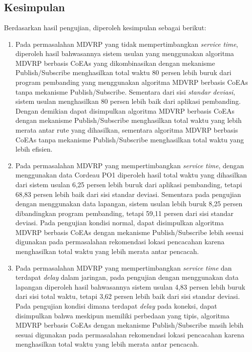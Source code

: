 \chapter{\kesimpulan}


\section{Kesimpulan}
Berdasarkan hasil pengujian, diperoleh kesimpulan sebagai berikut:

\begin{enumerate}
	\item Pada permasalahan MDVRP yang tidak mempertimbangkan \textit{service time}, diperoleh hasil bahwasannya sistem usulan yang menggunakan algoritma MDVRP berbasis CoEAs yang dikombinasikan dengan mekanisme Publish/Subscribe menghasilkan total waktu 80 persen lebih buruk dari program pembanding yang menggunakan algoritma MDVRP berbasis CoEAs tanpa mekanisme Publish/Subscribe. Sementara dari sisi \textit{standar deviasi}, sistem usulan menghasilkan 80 persen lebih baik dari aplikasi pembanding. Dengan demikian dapat disimpulkan algoritma MDVRP berbasis CoEAs dengan mekanisme Publish/Subscribe menghasilkan total waktu yang lebih merata antar rute yang dihasilkan, sementara algoritma MDVRP berbasis CoEAs tanpa mekanisme Publish/Subscribe menghasilkan total waktu yang lebih efisien.
	\item Pada permasalahan MDVRP yang mempertimbangkan \textit{service time}, dengan menggunakan data Cordeau PO1 diperoleh hasil total waktu yang dihasilkan dari sistem usulan 6,25 persen lebih buruk dari aplikasi pembanding, tetapi 68,83 persen lebih baik dari sisi standar deviasi. Sementara pada pengujian dengan menggunakan data lapangan, sistem usulan lebih buruk 8,25 persen dibandingkan program pembanding, tetapi 59,11 persen dari sisi standar deviasi. Pada pengujian kondisi normal, dapat disimpulkan algoritma MDVRP berbasis CoEAs dengan mekanisme Publish/Subscribe lebih sesuai digunakan pada permasalahan rekomendasi lokasi pencacahan karena menghasilkan total waktu yang lebih merata antar pencacah.
	\item Pada permasalahan MDVRP yang mempertimbangkan \textit{service time} dan terdapat \textit{delay} dalam jaringan, pada pengujian dengan menggunakan data lapangan diperoleh hasil bahwasannya sistem usulan 4,83 persen lebih buruk dari sisi total waktu, tetapi 3,62 persen lebih baik dari sisi standar deviasi. Pada pengujian kondisi dimana terdapat \textit{delay} pada koneksi, dapat disimpulkan bahwa meskipun memiliki perbedaan yang tipis, algoritma MDVRP berbasis CoEAs dengan mekanisme Publish/Subscribe masih lebih sesuai digunakan pada permasalahan rekomendasi lokasi pencacahan karena menghasilkan total waktu yang lebih merata antar pencacah.

\end{enumerate}

